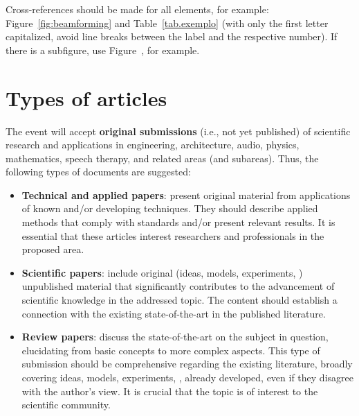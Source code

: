 Cross-references should be made for all elements, for example: Figure~\ref{fig:beamforming} and Table~\ref{tab.exemplo} (with only the first letter capitalized, avoid line breaks between the label and the respective number). If there is a subfigure, use Figure~, for example.


\section{Types of articles}

The event will accept \textbf{original submissions} (i.e., not yet published) of scientific research and applications in engineering, architecture, audio, physics, mathematics, speech therapy, and related areas (and subareas). Thus, the following types of documents are suggested:
%
\begin{itemize}[topsep=0ex] \itemsep=2pt
	\item \textbf{Technical and applied papers}:
	present original material from applications of known and/or developing techniques. They should describe applied methods that comply with standards and/or present relevant results. It is essential that these articles interest researchers and professionals in the proposed area.
	
	\item \textbf{Scientific papers}: 
	include original (ideas, models, experiments, \etc) unpublished material that significantly contributes to the advancement of scientific knowledge in the addressed topic. The content should establish a connection with the existing state-of-the-art in the published literature.

	\item \textbf{Review papers}:
	discuss the state-of-the-art on the subject in question, elucidating from basic concepts to more complex aspects. This type of submission should be comprehensive regarding the existing literature, broadly covering ideas, models, experiments, \etc, already developed, even if they disagree with the author's view. It is crucial that the topic is of interest to the scientific community.
\end{itemize}

\vspace{5pt}

